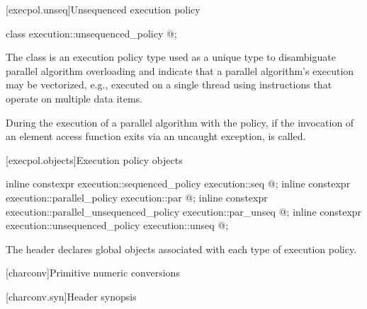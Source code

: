 [execpol.unseq]{Unsequenced execution policy}

%
\begin{itemdecl}
class execution::unsequenced_policy { @\unspec@ };
\end{itemdecl}

\pnum
The class  is an execution policy type
used as a unique type to disambiguate parallel algorithm overloading and
indicate that a parallel algorithm's execution may be vectorized,
e.g., executed on a single thread using instructions
that operate on multiple data items.

\pnum
During the execution of a parallel algorithm with
the  policy,
if the invocation of an element access function exits via an uncaught exception,
 is called.

[execpol.objects]{Execution policy objects}

%
%
%
%
%
%
\begin{itemdecl}
inline constexpr execution::sequenced_policy            execution::seq{ @\unspec@ };
inline constexpr execution::parallel_policy             execution::par{ @\unspec@ };
inline constexpr execution::parallel_unsequenced_policy execution::par_unseq{ @\unspec@ };
inline constexpr execution::unsequenced_policy          execution::unseq{ @\unspec@ };
\end{itemdecl}

\begin{itemdescr}
\pnum
The header  declares global objects associated with each type of execution policy.
\end{itemdescr}

[charconv]{Primitive numeric conversions}

[charconv.syn]{Header  synopsis}

